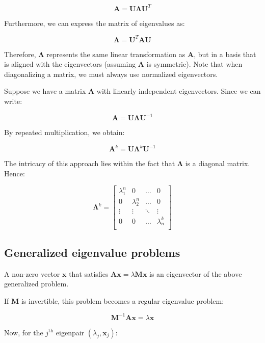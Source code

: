 \documentclass[12pt]{article}
\begin{document}
\[ \mathbf{A} = \mathbf{U\Lambda U}^T \]

Furthermore, we can express the matrix of eigenvalues as:

\[ \mathbf{\Lambda} = \mathbf{U}^T\mathbf{AU} \]

Therefore, $\mathbf{\Lambda}$ represents the same linear transformation as $\mathbf{A}$, but in a basis that is aligned with the eigenvectors (assuming $\mathbf{A}$ is symmetric). Note that when diagonalizing a matrix, we must always use normalized eigenvectors.

\begin{example}
    Suppose we have a matrix $\mathbf{A}$ with linearly independent eigenvectors. Since we can write:

    \[ \mathbf{A} = \mathbf{U\Lambda U}^{-1} \]

    By repeated multiplication, we obtain:

    \[ \mathbf{A}^k = \mathbf{U\Lambda}^k\mathbf{U}^{-1} \]

    The intricacy of this approach lies within the fact that $\mathbf{\Lambda}$ is a diagonal matrix. Hence:

    \[ \mathbf{\Lambda}^k = \begin{bmatrix}
    \lambda_1^n & 0 & \dots & 0 \\
    0 & \lambda_2^n & \dots & 0 \\
    \vdots & \vdots & \ddots & \vdots \\
    0 & 0 & \dots & \lambda_n^k \\
\end{bmatrix} \]
\end{example}

\newpage

\subsection{Generalized eigenvalue problems}

\begin{definition}
    A non-zero vector $\mathbf{x}$ that satisfies $\mathbf{Ax} = \lambda\mathbf{Mx}$ is an eigenvector of the above generalized problem.
\end{definition}

If $\mathbf{M}$ is invertible, this problem becomes a regular eigenvalue problem:

\[ \mathbf{M}^{-1}\mathbf{Ax} = \lambda\mathbf{x} \]

Now, for the $j^{\text{th}}$ eigenpair $(\lambda_j, \mathbf{x}_j)$:
\end{document}
